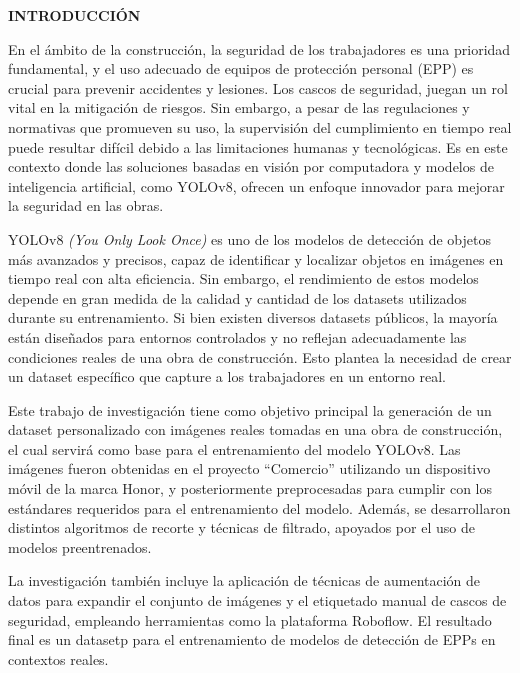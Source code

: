 \thispagestyle{plain}

\begin{center}
  \textbf{INTRODUCCIÓN}
\end{center}

\vspace{1cm}

\noindent
En el ámbito de la construcción, la seguridad de los trabajadores es una prioridad fundamental, y el uso adecuado de equipos de protección personal (EPP) es crucial para prevenir accidentes y lesiones. Los cascos de seguridad, juegan un rol vital en la mitigación de riesgos. Sin embargo, a pesar de las regulaciones y normativas que promueven su uso, la supervisión del cumplimiento en tiempo real puede resultar difícil debido a las limitaciones humanas y tecnológicas. Es en este contexto donde las soluciones basadas en visión por computadora y modelos de inteligencia artificial, como YOLOv8, ofrecen un enfoque innovador para mejorar la seguridad en las obras.

YOLOv8 \textit{(You Only Look Once)} es uno de los modelos de detección de objetos más avanzados y precisos, capaz de identificar y localizar objetos en imágenes en tiempo real con alta eficiencia. Sin embargo, el rendimiento de estos modelos depende en gran medida de la calidad y cantidad de los datasets utilizados durante su entrenamiento. Si bien existen diversos datasets públicos, la mayoría están diseñados para entornos controlados y no reflejan adecuadamente las condiciones reales de una obra de construcción. Esto plantea la necesidad de crear un dataset específico que capture a los trabajadores en un entorno real.

Este trabajo de investigación tiene como objetivo principal la generación de un dataset personalizado con imágenes reales tomadas en una obra de construcción, el cual servirá como base para el entrenamiento del modelo YOLOv8. Las imágenes fueron obtenidas en el proyecto ``Comercio'' utilizando un dispositivo móvil de la marca Honor, y posteriormente preprocesadas para cumplir con los estándares requeridos para el entrenamiento del modelo. Además, se desarrollaron distintos algoritmos de recorte y técnicas de filtrado, apoyados por el uso de modelos preentrenados.

La investigación también incluye la aplicación de técnicas de aumentación de datos para expandir el conjunto de imágenes y el etiquetado manual de cascos de seguridad, empleando herramientas como la plataforma Roboflow. El resultado final es un datasetp para el entrenamiento de modelos de detección de EPPs en contextos reales.

\vfill

\pagebreak